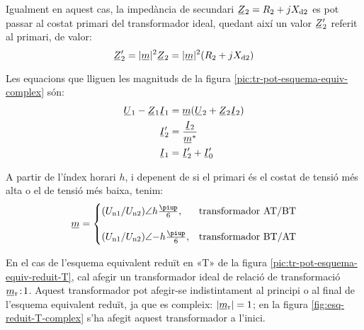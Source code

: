 \begin{center}
    
    \label{pic:tr-pot-esquema-equiv-complex}
\end{center}

Igualment en aquest cas, la impedància de secundari $\cmplx{Z}_2=R_2 + j X\ped{d2}$ es pot passar al costat primari del transformador ideal, quedant així un valor $\cmplx{Z}_2'$ referit al primari, de valor:
\begin{equation}
    \cmplx{Z}_2' = |\cmplx{m}|^2 \cmplx{Z}_2  = |\cmplx{m}|^2 (R_2 + j X\ped{d2})\label{eq:ZmZ}
\end{equation}

Les equacions que lliguen les magnituds de la figura \vref{pic:tr-pot-esquema-equiv-complex} són:
\begin{subequations}
\begin{align}
    \cmplx{U}_1 - \cmplx{Z}_1 \cmplx{I}_1 &= \cmplx{m} ( \cmplx{U}_2  + \cmplx{Z}_2 \cmplx{I}_2 ) \label{eq:UmZ}\\
    \cmplx{I}'_2 &= \frac{\cmplx{I}_2}{\cmplx{m}^*} \label{eq:ImI}\\
    \cmplx{I}_1  &=   \cmplx{I}_2' + \cmplx{I}_0' \label{eq:III}
\end{align}
\end{subequations}

A partir de l'índex horari $h$, i depenent de si el primari és el costat de tensió més alta o el de tensió més baixa, tenim:
\begin{equation}
\cmplx{m} = \begin{cases}
     (U\ped{n1}/U\ped{n2})\angle h \frac{\piup}{6}, & \text{transformador AT/BT}\\[2.7ex]
     (U\ped{n1}/U\ped{n2})\angle{-h} \frac{\piup}{6}, & \text{transformador BT/AT}
\end{cases}
\label{eq:rel-transf-cmplx}
\end{equation}

En el cas de l'esquema equivalent reduït en «T» de la figura \vref{pic:tr-pot-esquema-equiv-reduit-T}, cal afegir un transformador ideal de relació de transformació  $\cmplx{m}\ped{r}\!:\!1$. Aquest transformador pot afegir-se indistintament  al principi o al final de l'esquema equivalent reduït, ja que es compleix: $|\cmplx{m}\ped{r}|=1$;  en la figura \vref{fig:esq-reduit-T-complex} s'ha afegit aquest transformador a l'inici.


\begin{center}
    
    \label{fig:esq-reduit-T-complex}
\end{center}

